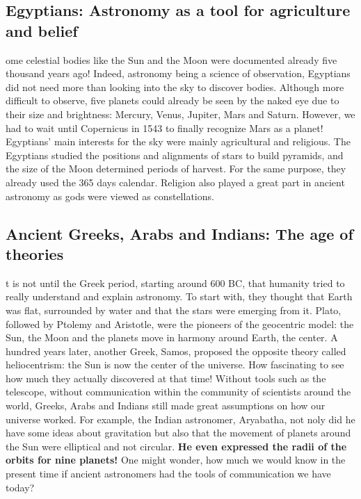 \subsection{Egyptians: Astronomy as a tool for agriculture and belief}
ome celestial bodies like the Sun and the Moon were documented already five thousand years ago!
Indeed, astronomy being a science of observation, Egyptians did not need more than looking into the sky to discover bodies.
Although more difficult to observe, five planets could already be seen by the naked eye due to their size and brightness:
Mercury, Venus, Jupiter, Mars and Saturn.
However, we had to wait until Copernicus in 1543 to finally recognize Mars as a planet!
Egyptians' main interests for the sky were mainly agricultural and religious.
The Egyptians studied the positions and alignments of stars to build pyramids, and the size of the Moon determined periods of harvest.
For the same purpose, they already used the 365 days calendar.
Religion also played a great part in ancient astronomy as gods were viewed as constellations.
\cite{Egyptians}

\subsection{Ancient Greeks, Arabs and Indians: The age of theories}
t is not until the Greek period, starting around 600 BC, that humanity tried to really understand and explain astronomy. 
To start with, they thought that Earth was flat, surrounded by water and that the stars were emerging from it. 
Plato, followed by Ptolemy and Aristotle, were the pioneers of the geocentric model: the Sun, the Moon and the planets move in harmony around Earth, the center.
A hundred years later, another Greek, Samos, proposed the opposite theory called heliocentrism: the Sun is now the center of the universe.
How fascinating to see how much they actually discovered at that time!  
Without tools such as the telescope, without communication within the community of scientists around the world, Greeks, Arabs and Indians still made great assumptions on how our universe worked. 
For example, the Indian astronomer, Aryabatha, not noly did he have some ideas about gravitation but also that the movement of planets around the Sun were elliptical and not circular. 
\textbf{He even expressed the radii of the orbits for nine planets!}
One might wonder, how much we would know in the present time if ancient astronomers had the tools of communication we have today?
\cite{GreekAstro}
\cite{Aryabatha}

